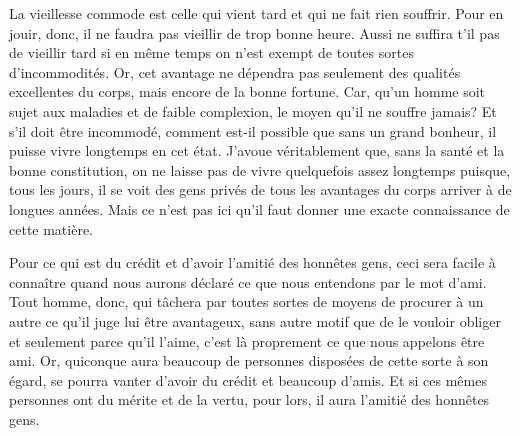 La vieillesse commode est celle qui vient tard et qui ne fait rien souffrir. Pour en jouir, donc, il ne faudra pas vieillir
de trop bonne heure. Aussi ne suffira t'il pas de vieillir tard si en même temps on n'est exempt de toutes sortes
d'incommodités. Or, cet avantage ne dépendra pas seulement des qualités excellentes du corps, mais encore de la bonne
fortune. Car, qu'un homme soit sujet aux maladies et de faible complexion, le moyen qu'il ne souffre jamais? Et s'il doit
être incommodé, comment est-il possible que sans un grand bonheur, il puisse vivre longtemps en cet état. J'avoue
véritablement que, sans la santé et la bonne constitution, on ne laisse pas de vivre quelquefois assez longtemps puisque,
tous les jours, il se voit des gens privés de tous les avantages du corps arriver à de longues années. Mais ce n'est pas
ici qu'il faut donner une exacte connaissance de cette matière.

\bigbreak

Pour ce qui est du crédit et d'avoir l'amitié des honnêtes gens, ceci sera facile à connaître quand nous aurons déclaré ce
que nous entendons par le mot d'ami. Tout homme, donc, qui tâchera par toutes sortes de moyens de procurer à un autre ce
qu'il juge lui être avantageux, sans autre motif que de le vouloir obliger et seulement parce qu'il l'aime, c'est là
proprement ce que nous appelons être ami. Or, quiconque aura beaucoup de personnes disposées de cette sorte à son égard,
se pourra vanter d'avoir du crédit et beaucoup d'amis. Et si ces mêmes personnes ont du mérite et de la vertu, pour lors,
il aura l'amitié des honnêtes gens.

\bigbreak

